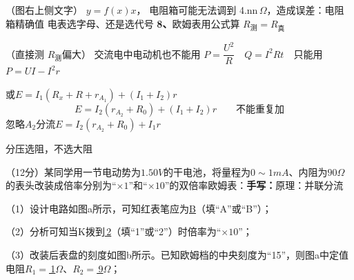 （图右上侧文字） $y=f(x)x$，
电阻箱可能无法调到 4.nn$\,\Omega$，造成误差：电阻箱精确值
电表选字母、还是选代号
\textbf{8、}欧姆表用公式算 $R_{\text{测}}=R_{\text{真}}$\par
（直接测 $R_{\text{测}}$偏大）
交流电中电动机也不能用 $P=\dfrac{U^2}{R}$　$Q=I^2Rt$　只能用 $P=UI-I^2r$ %
\begin{problem}
\begin{solution}
或\quad $E=I_1(R_x+R+r_{A_1})+(I_1+I_2)r$
\[ E=I_2(r_{A_2}+R_0)+(I_1+I_2)r\qquad\text{不能重复加} \]
忽略$A_2$分流\quad $E=I_2(r_{A_2}+R_0)+I_1r$
\end{solution}
\end{problem}
分压选阻，不选大阻
\begin{problem}[19]
（12分）某同学用一节电动势为$1.50\unit{V}$的干电池，将量程为$0\sim1\unit{mA}$、内阻为$90\unit{\Omega}$的表头改装成倍率分别为“$\times1$”和“$\times10$”的双倍率欧姆表：\quad \textbf{手写：}原理：并联分流%

（1）设计电路如图a所示，可知红表笔应为\underline{\quad B\quad}（填“A”或“B”\unclear{$\checkmark$}）；%

（2）分析可知当K拨到\underline{\quad{}\,2\quad}（填“1”或“2”）时倍率为“$\times10$”；%

（3）改装后表盘的刻度如图b所示。已知欧姆档的中央刻度为“15”，则图a中定值电阻$R_1=$\underline{\quad{}\,1\quad}$\unit{\Omega}$、$R_2=$\underline{\quad{}\,9\quad}$\unit{\Omega}$；%


\end{problem}

